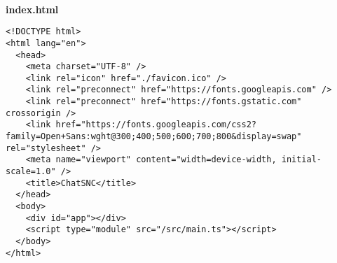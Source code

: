 \
\\
\textbf{index.html}

\begin{Verbatim}[breaklines=true, breakanywhere=true]
<!DOCTYPE html>
<html lang="en">
  <head>
    <meta charset="UTF-8" />
    <link rel="icon" href="./favicon.ico" />
    <link rel="preconnect" href="https://fonts.googleapis.com" />
    <link rel="preconnect" href="https://fonts.gstatic.com" crossorigin />
    <link href="https://fonts.googleapis.com/css2?family=Open+Sans:wght@300;400;500;600;700;800&display=swap" rel="stylesheet" />
    <meta name="viewport" content="width=device-width, initial-scale=1.0" />
    <title>ChatSNC</title>
  </head>
  <body>
    <div id="app"></div>
    <script type="module" src="/src/main.ts"></script>
  </body>
</html>

\end{Verbatim}
